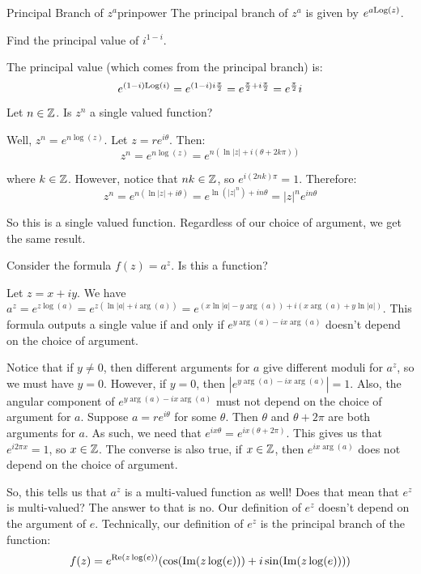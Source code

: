 \begin{defbo}{Principal Branch of $z^a$}{prinpower}
The principal branch of $z^a$ is given by $e^{a\mathrm{Log}(z)}$.
\end{defbo}

\begin{ex}{}{} Find the principal value of $i^{1 - i}$.

The principal value (which comes from the principal branch) is:
$$e^{(1-i)\mathrm{Log}(i)} = e^{(1-i)i\frac{\pi}{2}} = e^{\frac{\pi}{2} + i\frac{\pi}{2}} = e^{\frac{\pi}{2}}i$$
\end{ex}

\begin{ex}{}{} Let $n\in \mathbb{Z}$. Is $z^n$ a single valued function?

Well, $z^n = e^{n\log(z)}$. Let $z = re^{i\theta}$. Then:
$$z^n = e^{n\log(z)} = e^{n(\ln|z| + i(\theta + 2k\pi))}$$

\noin where $k\in \mathbb{Z}$. However, notice that $nk\in \mathbb{Z}$, so $e^{i(2nk)\pi} = 1$. Therefore:
$$z^n = e^{n(\ln|z| + i\theta)} = e^{\ln(|z|^n) + in\theta} = |z|^ne^{in\theta}$$

So this is a single valued function. Regardless of our choice of argument, we get the same result.
\end{ex}

\begin{ex}{}{} Consider the formula $f(z) = a^z$. Is this a function?

Let $z = x +iy$. We have $a^z = e^{z\log(a)} = e^{z(\ln|a| + i\arg(a))} = e^{(x\ln|a| - y\arg(a)) + i(x\arg(a) + y\ln|a|)}$. This formula outputs a single value if and only if $e^{y\arg(a) - ix\arg(a)}$ doesn't depend on the choice of argument.

Notice that if $y\ne 0$, then different arguments for $a$ give different moduli for $a^z$, so we must have $y = 0$. However, if $y = 0$, then $|e^{y\arg(a) - ix\arg(a)}| = 1$. Also, the angular component of $e^{y\arg(a) - ix\arg(a)}$ must not depend on the choice of argument for $a$. Suppose $a = re^{i\theta}$ for some $\theta$. Then $\theta$ and $\theta + 2\pi$ are both arguments for $a$. As such, we need that $e^{ix\theta} = e^{ix(\theta + 2\pi)}$. This gives us that $e^{i2\pi x} = 1$, so $x\in \mathbb{Z}$. The converse is also true, if $x\in \mathbb{Z}$, then $e^{ix\arg(a)}$ does not depend on the choice of argument.
\end{ex}

So, this tells us that $a^z$ is a multi-valued function as well! Does that mean that $e^z$ is multi-valued? The answer to that is no. Our definition of $e^z$ doesn't depend on the argument of $e$. Technically, our definition of $e^z$ is the principal branch of the function:
$$f(z) = e^{\operatorname{Re}(z\log(e))}(\cos(\operatorname{Im}(z\log(e))) + i\sin(\operatorname{Im}(z\log(e))))$$

